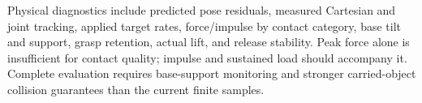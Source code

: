 Physical diagnostics include predicted pose residuals, measured Cartesian and
joint tracking, applied target rates, force/impulse by contact category,
base tilt and support, grasp retention, actual lift, and release stability.
Peak force alone is insufficient for contact quality; impulse and sustained
load should accompany it. Complete evaluation requires base-support monitoring
and stronger carried-object collision guarantees than the current finite samples.
